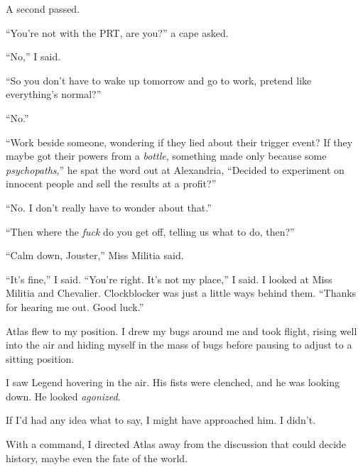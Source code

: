 A second passed.



``You're not with the PRT, are you?'' a cape asked.



``No,'' I said.



``So you don't have to wake up tomorrow and go to work, pretend like everything's normal?''



``No.''



``Work beside someone, wondering if they lied about their trigger event?  If they maybe got their powers from a \emph{bottle}, something made only because some \emph{psychopaths},'' he spat the word out at Alexandria, ``Decided to experiment on innocent people and sell the results at a profit?''



``No.  I don't really have to wonder about that.''



``Then where the \emph{fuck} do you get off, telling us what to do, then?''



``Calm down, Jouster,'' Miss Militia said.



``It's fine,'' I said.  ``You're right.  It's not my place,'' I said.  I looked at Miss Militia and Chevalier.  Clockblocker was just a little ways behind them.  ``Thanks for hearing me out.  Good luck.''



Atlas flew to my position.  I drew my bugs around me and took flight, rising well into the air and hiding myself in the mass of bugs before pausing to adjust to a sitting position.



I saw Legend hovering in the air.  His fists were clenched, and he was looking down.  He looked \emph{agonized}.



If I'd had any idea what to say, I might have approached him.  I didn't.



With a command, I directed Atlas away from the discussion that could decide history, maybe even the fate of the world.



\sectionbreak



